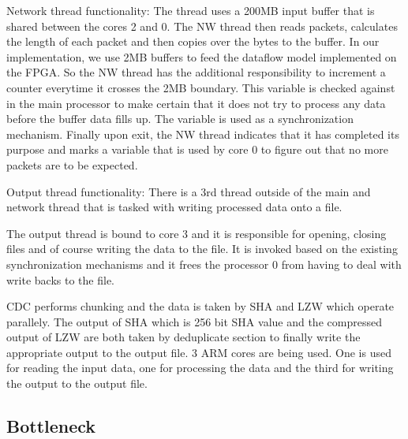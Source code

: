 \documentclass{article}
\begin{document}
Network thread functionality: 
\newline\newline
The thread uses a 200MB input buffer that is shared between the cores 2 and 0.
\newline
The NW thread then reads packets, calculates the length of each packet and then copies over the bytes to the buffer.
\newline
In our implementation, we use 2MB buffers to feed the dataflow model implemented on the FPGA.
\newline
So the NW thread has the additional responsibility to increment a counter everytime it crosses the 2MB boundary. 
This variable is checked against in the main processor to make certain that it does not try to process any data before the buffer data fills up. The variable is used as a synchronization mechanism.
\newline
Finally upon exit, the NW thread indicates that it has completed its purpose and marks a variable that is used by core 0 to figure out that no more packets are to be expected.
\newline

Output thread functionality:
\newline\newline
There is a 3rd thread outside of the main and network thread that is tasked with writing processed data onto a file. 
\par
The output thread is bound to core 3 and it is responsible for opening, closing files and of course writing the data to the file. 
It is invoked based on the existing synchronization mechanisms and it frees the processor 0 from having to deal with write backs to the file. 
\newline

CDC performs chunking and the data is taken by SHA and LZW which operate parallely. The output of SHA which is 256 bit SHA value and the compressed output of LZW are both taken by deduplicate section to finally write the appropriate output to the output file. 
3 ARM cores are being used. One is used for reading the input data, one for processing the data and the third for writing the output to the output file.  

\subsection{Bottleneck}
\end{document}
